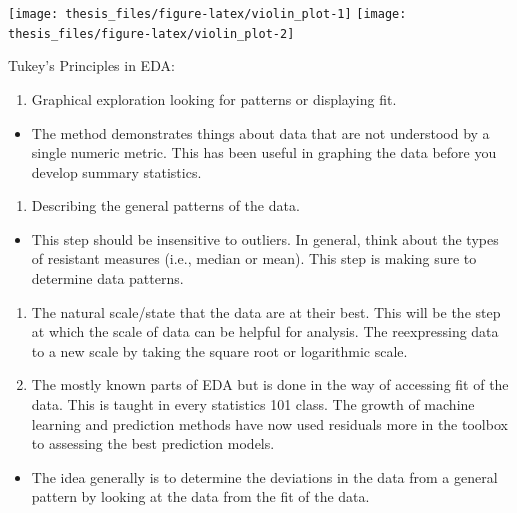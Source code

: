 \documentclass[print]{nuthesis}
\providecommand{\tightlist}{%
  \setlength{\itemsep}{0pt}\setlength{\parskip}{0pt}}
\begin{document}
\begin{center}\texttt{[image: thesis\_files/figure-latex/violin\_plot-1]} \texttt{[image: thesis\_files/figure-latex/violin\_plot-2]} \end{center}

Tukey's Principles in EDA:

\begin{enumerate}
\def\labelenumi{\arabic{enumi}.}
\tightlist
\item
  Graphical exploration looking for patterns or displaying fit.
\end{enumerate}

\begin{itemize}
\tightlist
\item
  The method demonstrates things about data that are not understood by a single numeric metric. This has been useful in graphing the data before you develop summary statistics.
\end{itemize}

\begin{enumerate}
\def\labelenumi{\arabic{enumi}.}
\setcounter{enumi}{1}
\tightlist
\item
  Describing the general patterns of the data.
\end{enumerate}

\begin{itemize}
\tightlist
\item
  This step should be insensitive to outliers. In general, think about the types of resistant measures (i.e., median or mean). This step is making sure to determine data patterns.
\end{itemize}

\begin{enumerate}
\def\labelenumi{\arabic{enumi}.}
\setcounter{enumi}{2}
\item
  The natural scale/state that the data are at their best. This will be the step at which the scale of data can be helpful for analysis. The reexpressing data to a new scale by taking the square root or logarithmic scale.
\item
  The mostly known parts of EDA but is done in the way of accessing fit of the data. This is taught in every statistics 101 class. The growth of machine learning and prediction methods have now used residuals more in the toolbox to assessing the best prediction models.
\end{enumerate}

\begin{itemize}
\tightlist
\item
  The idea generally is to determine the deviations in the data from a general pattern by looking at the data from the fit of the data.
\end{itemize}
\end{document}
